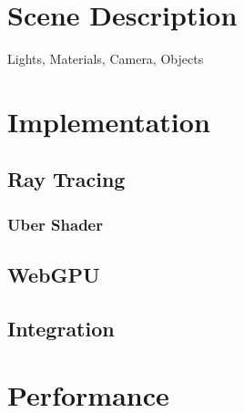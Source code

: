 
\section{Scene Description}
Lights, Materials, Camera, Objects
\section{Implementation}
\subsection{Ray Tracing}
\subsubsection{Uber Shader}
\subsection{WebGPU}
\subsection{Integration}
\section{Performance}